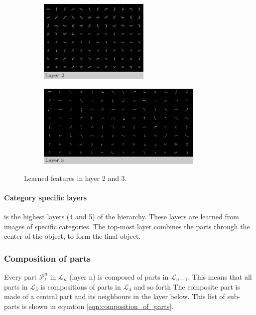 \begin{figure}[h!] %
	\centering
\begin{subfigure}[b]{0.3\textwidth}
	\includegraphics[height=4cm]{graphics/layer2_features}
\end{subfigure}
\hspace{1cm}
\begin{subfigure}[b]{0.3\textwidth}
	\includegraphics[height=4cm]{graphics/layer3_features}
\end{subfigure}
\caption{Learned features in layer 2 and 3. 
\cite[fig.~7]{fidler2009learning} }
\label{fig:layer2+3}
\end{figure}

\paragraph*{Category specific layers} is the highest layers (4 and 5) of the hierarchy. These layers are learned from images of specific categories. The top-most layer combines the parts through the center of the object, to form the final object. 


\subsubsection{Composition of parts}
\label{sec:composition-of-parts}
Every part $\mathcal{P}_{\ell}^n$  in $\mathcal{L}_n$ (layer n) is composed of parts in $\mathcal{L}_{n-1}$. This means that all parts in $\mathcal{L}_5$  is compositions of parts in $\mathcal{L}_4$  and so forth
The composite part is made of a central part and its neighbours in the layer below. 
This list of sub-parts is shown in equation \ref{eqn:composition_of_parts}. 


